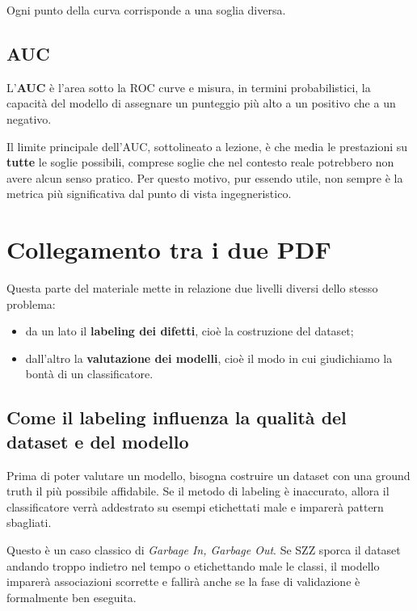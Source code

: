Ogni punto della curva corrisponde a una soglia diversa.

\subsection{AUC}

L'\textbf{AUC} è l'area sotto la ROC curve e misura, in termini probabilistici, la capacità del modello di assegnare un punteggio più alto a un positivo che a un negativo.

\begin{notaesame}
Il limite principale dell'AUC, sottolineato a lezione, è che media le prestazioni su \textbf{tutte} le soglie possibili, comprese soglie che nel contesto reale potrebbero non avere alcun senso pratico. Per questo motivo, pur essendo utile, non sempre è la metrica più significativa dal punto di vista ingegneristico.
\end{notaesame}

\section{Collegamento tra i due PDF}

Questa parte del materiale mette in relazione due livelli diversi dello stesso problema:

\begin{itemize}
    \item da un lato il \textbf{labeling dei difetti}, cioè la costruzione del dataset;
    \item dall'altro la \textbf{valutazione dei modelli}, cioè il modo in cui giudichiamo la bontà di un classificatore.
\end{itemize}

\subsection{Come il labeling influenza la qualità del dataset e del modello}

Prima di poter valutare un modello, bisogna costruire un dataset con una ground truth il più possibile affidabile. Se il metodo di labeling è inaccurato, allora il classificatore verrà addestrato su esempi etichettati male e imparerà pattern sbagliati.

\begin{notaprof}
Questo è un caso classico di \emph{Garbage In, Garbage Out}. Se SZZ sporca il dataset andando troppo indietro nel tempo o etichettando male le classi, il modello imparerà associazioni scorrette e fallirà anche se la fase di validazione è formalmente ben eseguita.
\end{notaprof}

